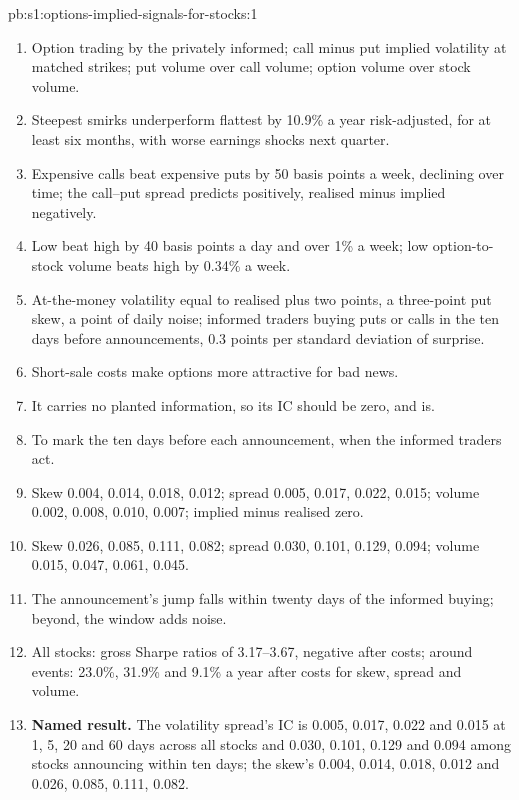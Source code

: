 \begin{solution}{pb:s1:options-implied-signals-for-stocks:1}
\begin{enumerate}
\item Option trading by the privately informed; call minus put implied volatility at matched strikes; put volume over call volume; option volume over stock
volume.
\item Steepest smirks underperform flattest by 10.9\% a year risk-adjusted, for at least six months, with worse earnings shocks next quarter.
\item Expensive calls beat expensive puts by 50 basis points a week, declining over time; the call--put spread predicts positively, realised minus implied
negatively.
\item Low  beat high by 40 basis points a day and over 1\% a week; low option-to-stock volume beats high by 0.34\% a week.
\item At-the-money volatility equal to realised plus two points, a three-point put skew, a point of daily noise; informed traders buying puts or calls in the
ten days before announcements, 0.3 points per standard deviation of surprise.
\item Short-sale costs make options more attractive for bad news.
\item It carries no planted information, so its IC should be zero, and is.
\item To mark the ten days before each announcement, when the informed traders act.
\item Skew 0.004, 0.014, 0.018, 0.012; spread 0.005, 0.017, 0.022, 0.015; volume 0.002, 0.008, 0.010, 0.007; implied minus realised zero.
\item Skew 0.026, 0.085, 0.111, 0.082; spread 0.030, 0.101, 0.129, 0.094; volume 0.015, 0.047, 0.061, 0.045.
\item The announcement's jump falls within twenty days of the informed buying; beyond, the window adds noise.
\item All stocks: gross Sharpe ratios of 3.17--3.67, negative after costs; around events: 23.0\%, 31.9\% and 9.1\% a year after costs for skew, spread and volume.
\item \textbf{Named result.} The volatility spread's IC is 0.005, 0.017, 0.022 and 0.015 at 1, 5, 20 and 60 days across all stocks and 0.030, 0.101, 0.129 and
0.094 among stocks announcing within ten days; the skew's 0.004, 0.014, 0.018, 0.012 and 0.026, 0.085, 0.111, 0.082.

\end{enumerate}
\end{solution}
